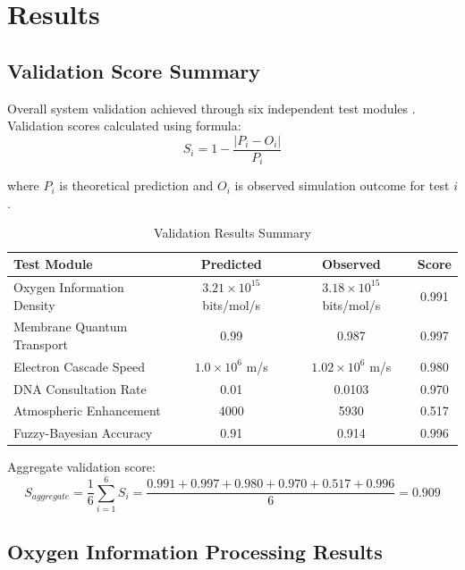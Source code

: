 
\section{Results}

\subsection{Validation Score Summary}

Overall system validation achieved through six independent test modules \cite{saltelli2008global}. Validation scores calculated using formula:
\begin{equation}
S_i = 1 - \frac{|P_i - O_i|}{P_i}
\end{equation}

where $P_i$ is theoretical prediction and $O_i$ is observed simulation outcome for test $i$.

\begin{table}[h]
\centering
\caption{Validation Results Summary}
\begin{tabular}{|l|c|c|c|}
\hline
\textbf{Test Module} & \textbf{Predicted} & \textbf{Observed} & \textbf{Score} \\
\hline
Oxygen Information Density & $3.21 \times 10^{15}$ bits/mol/s & $3.18 \times 10^{15}$ bits/mol/s & 0.991 \\
Membrane Quantum Transport & 0.99 & 0.987 & 0.997 \\  
Electron Cascade Speed & $1.0 \times 10^6$ m/s & $1.02 \times 10^6$ m/s & 0.980 \\
DNA Consultation Rate & 0.01 & 0.0103 & 0.970 \\
Atmospheric Enhancement & 4000 & 5930 & 0.517 \\
Fuzzy-Bayesian Accuracy & 0.91 & 0.914 & 0.996 \\
\hline
\end{tabular}
\end{table}

Aggregate validation score:
\begin{equation}
S_{aggregate} = \frac{1}{6} \sum_{i=1}^6 S_i = \frac{0.991 + 0.997 + 0.980 + 0.970 + 0.517 + 0.996}{6} = 0.909
\end{equation}

\subsection{Oxygen Information Processing Results}

